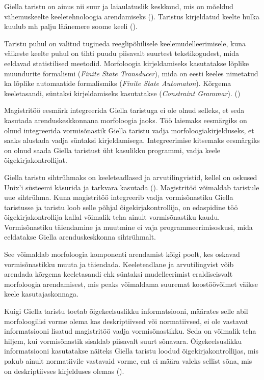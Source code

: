 \documentclass[12pt,a4paper]{article}
\begin{document}
Giella taristu on ainus nii suur ja laia\-ulatuslik keskkond, mis on mõeldud vähemus\-keelte keele\-tehnoloogia arendamiseks (\cite[346]{moshagen_building_2013}). Taristus kirjeldatud keelte hulka kuulub mh palju lääne\-mere soome keeli (\cite[349]{moshagen_building_2013}).

Taristu puhul on valitud tugineda reegli\-põhilisele keele\-mudelleerimisele, kuna väikeste keelte puhul on tihti puudu piisavalt suurtest teksti\-kogudest, mida eeldavad statistilised meetodid. Morfoloogia kirjeldamiseks kasutatakse lõplike muundurite formalismi (\textit{Finite State Transducer}), mida on eesti keeles nimetatud ka lõplike automaatide formalismiks (\textit{Finite State Automaton}). Kõrgema keele\-tasandi, süntaksi kirjeldamiseks kasutatakse (\textit{Constraint Grammar}). (\cite[346]{moshagen_building_2013})

Magistritöö eesmärk integreerida Giella taristuga ei ole olnud selleks, et seda kasutada arendus\-keskkonnana morfoloogia jaoks. Töö laiemaks eesmärgiks on olnud integreerida vormi\-sõnastik Giella taristu vadja morfoloogia\-kirjelduseks, et saaks alustada vadja süntaksi kirjeldamisega. Integreerimise kitsemaks eesmärgiks on olnud saada Giella taristust üht kasulikku programmi, vadja keele õige\-kirja\-kontrollijat. 

Giella taristu sihtrühmaks on keeleteadlased ja arvuti\-lingvistid, kellel on oskused Unix'i süsteemi käsurida ja tarkvara kasutada (\cite[347]{moshagen_building_2013}). Magistri\-töö võimaldab taristule uue sihtrühma. Kuna magistri\-töö integreerib vadja vormi\-sõnastiku Giella taristusse ja taristu loob selle põhjal õige\-kirja\-kontrollija, on edas\-pidine töö õige\-kirja\-kontrollija kallal võimalik teha ainult vormi\-sõnastiku kaudu. Vormi\-sõnastiku täiendamine ja muutmine ei vaja programmeerimis\-oskusi, mida eeldatakse Giella arendus\-keskkonna siht\-rühmalt. %

See võimaldab morfoloogia komponenti arendamist kõigi poolt, kes oskavad vormisõnastikku muuta ja täiendada. Keele\-teadlane ja arvuti\-lingvist võib arendada kõrgema keele\-tasandi ehk süntaksi mudelleerimist eraldi\-seisvalt morfoloogia arendamisest, mis peaks võimaldama suuremat koos\-töö\-võimet väikse keele kasutajas\-konnaga.

Kuigi Giella taristu toetab õige\-keelsuslikku informatsiooni, määrates selle abil morfoloogilisi vorme olema kas deskriptiivsed või normatiivsed, ei ole vastavat informatsiooni lisatud magistritöö vadja vormi\-sõnastikku. Seda on võimalik teha hiljem, kui vormi\-sõnastik sisaldab piisavalt suurt sõna\-vara. Õige\-keelsuslikku informatsiooni kasutatakse näiteks Giella taristu loodud õige\-kirja\-kontrollijas, mis pakub ainult normatiivile vastavaid vorme, ent ei määra valeks sellist sõna, mis on deskriptiivses kirjelduses olemas (\citeyear{moshagen_building_2013}). %
\end{document}
